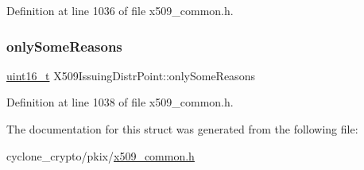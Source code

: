 Definition at line 1036 of file x509\+\_\+common.\+h.

\mbox{\label{structX509IssuingDistrPoint_a5192983171fe2337eedb43f29080ac50}} 
\subsubsection{\texorpdfstring{only\+Some\+Reasons}{onlySomeReasons}}
{\footnotesize\ttfamily \hyperlink{stdint_8h_a273cf69d639a59973b6019625df33e30}{uint16\+\_\+t} X509\+Issuing\+Distr\+Point\+::only\+Some\+Reasons}



Definition at line 1038 of file x509\+\_\+common.\+h.



The documentation for this struct was generated from the following file\+:\begin{DoxyCompactItemize}
\item 
cyclone\+\_\+crypto/pkix/\hyperlink{pkix_2x509__common_8h}{x509\+\_\+common.\+h}\end{DoxyCompactItemize}
